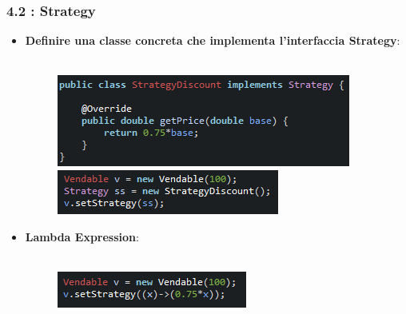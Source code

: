 \documentclass{beamer}
\begin{document}
\begin{frame}[fragile]
	\frametitle{\textbf{4.2 : Strategy}}
	\begin{itemize}
		\item
			\textbf{Definire una classe concreta che implementa l'interfaccia Strategy}:\\\
			\begin{figure}
				\centering
				\includegraphics[width=0.6\linewidth]{image/strategyConcreta.png}
				\label{fig:target}
				\centering
				\includegraphics[width=0.6\linewidth]{image/createStrategy.png}
				\label{fig:target}
			\end{figure}
		\item
			\textbf{Lambda Expression}:\\\
			\begin{figure}
				\centering
				\includegraphics[width=0.6\linewidth]{image/lambdaStrategy.png}
				\label{fig:target}
			\end{figure}
	\end{itemize}
\end{frame}

\end{document}
